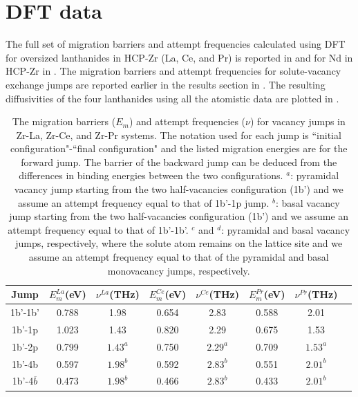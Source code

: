 \documentclass[preprint,12pt]{elsarticle}
\begin{document}
\FloatBarrier
\section{DFT data}
\label{app:dft_data}
The full set of migration barriers and attempt frequencies calculated using DFT for oversized lanthanides in HCP-Zr (La, Ce, and Pr) is reported in  and for Nd in HCP-Zr in .  The migration barriers and attempt frequencies for solute-vacancy exchange jumps are reported earlier in the results section in . The resulting diffusivities of the four lanthanides using all the atomistic data are plotted in .



\begin{table}[h!]
    \centering
    \caption{The migration barriers ($E_m$) and attempt frequencies ($\nu$) for vacancy jumps in Zr-La, Zr-Ce, and Zr-Pr systems. The notation used for each jump is ``initial configuration"-``final configuration" and the listed migration energies are for the forward jump. The barrier of the backward jump can be deduced from the differences in binding energies between the two configurations.
    $^a$: pyramidal vacancy jump starting from the two half-vacancies configuration (1b') and we assume an attempt frequency equal to that of 1b'-1p jump. $^b$: basal vacancy jump starting from the two half-vacancies configuration (1b') and we assume an attempt frequency equal to that of 1b'-1b'. $^c$ and $^d$: pyramidal and basal vacancy jumps, respectively, where the solute atom remains on the lattice site and we assume an attempt frequency equal to that of the pyramidal and basal monovacancy jumps, respectively. }
    \begin{tabular}{c|c|c|c|c|c|c|c}
    \toprule
       Jump &$E_{m}^{La}$(eV) &$\nu^{La}$(THz) &$E_{m}^{Ce}$(eV) &$\nu^{Ce}$(THz)&$E_{m}^{Pr}$(eV) &$\nu^{Pr}$(THz)  \\
       \hline
       1b'-1b'  &0.788  &1.98 &0.654 &2.83 &0.588 &2.01 \\
       1b'-1p  &1.023  &1.43 &0.820 &2.29 &0.675 &1.53 \\
       1b'-2p  &0.799  &$1.43^{a}$ &0.750 &$2.29^{a}$ &0.709 &$1.53^{a}$ \\
       1b'-4b  &0.597  &$1.98^b$ &0.592 &$2.83^b$ &0.551 &$2.01^b$ \\
       1b'-4$\overline{b}$  &0.473  &$1.98^b$ &0.466 &$2.83^b$ &0.433 &$2.01^b$ \\

\end{tabular}
\end{table}
\end{document}
